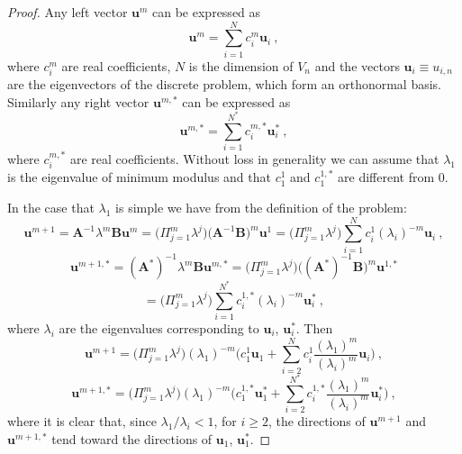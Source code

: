 \documentclass[smallextended]{svjour3}
\begin{document}
\begin{proof}

Any left vector $\mathbf{u}^m$ can be expressed as 
$$
\mathbf{u}^m=\sum_{i=1}^N c_i^m \mathbf{u}_i\ ,
$$
where $c_i^m$ are real coefficients, $N$ is the dimension of $V_n$ and the vectors $\mathbf{u}_i\equiv u_{i,n}$ are the eigenvectors of the discrete problem, which form an orthonormal basis.
Similarly any right vector $\mathbf{u}^{m,*}$ can be expressed as 
$$
\mathbf{u}^{m,*}=\sum_{i=1}^{N^*} c_i^{m,*} \mathbf{u}_i^*\ ,
$$
where $c_i^{m,*}$ are real coefficients.
Without loss in generality we can assume that $\lambda_1$ is the 
eigenvalue of minimum modulus and that $c_1^1$ and $c_1^{1,*}$ are different from 0.

In the case that $\lambda_1$ is simple we have from the definition of the problem:
$$
\mathbf{u}^{m+1}=\mathbf{A}^{-1}\lambda^m\mathbf{B}\mathbf{u}^{m}
=\Big(\Pi_{j=1}^m\lambda^{j}\Big)\Big(\mathbf{A}^{-1}\mathbf{B}\Big)^m\mathbf{u}^1
=\Big(\Pi_{j=1}^m\lambda^{j}\Big)\sum_{i=1}^N c_i^1 (\lambda_i)^{-m}\mathbf{u}_i\ ,
$$
$$
\mathbf{u}^{m+1,*}=(\mathbf{A}^*)^{-1}\lambda^m\mathbf{B}\mathbf{u}^{m,*}
=\Big(\Pi_{j=1}^m\lambda^{j}\Big)\Big((\mathbf{A}^*)^{-1}\mathbf{B}\Big)^m\mathbf{u}^{1,*}
$$
$$
=\Big(\Pi_{j=1}^m\lambda^{j}\Big)\sum_{i=1}^{N^*} c_i^{1,*} (\lambda_i)^{-m}\mathbf{u}_i^*\ ,
$$
where $\lambda_i$ are the eigenvalues corresponding to $\mathbf{u}_i$, $\mathbf{u}_i^*$.
Then
\begin{equation}\label{eq:picard_proof_1}
\mathbf{u}^{m+1}=\Big(\Pi_{j=1}^m\lambda^{j}\Big)(\lambda_1)^{-m}\Big( c_1^1 \mathbf{u}_1 +
\sum_{i=2}^N c_i^1\frac{(\lambda_1)^m}{(\lambda_i)^{m}}\mathbf{u}_i\Big) \ ,
\end{equation}
\begin{equation}\label{eq:picard_proof_2}
\mathbf{u}^{m+1,*}=\Big(\Pi_{j=1}^m\lambda^{j}\Big)(\lambda_1)^{-m}\Big( c_1^{1,*} \mathbf{u}_1^* +
\sum_{i=2}^{N^*} c_i^{1,*}\frac{(\lambda_1)^m}{(\lambda_i)^{m}}\mathbf{u}_i^*\Big) \ ,
\end{equation}
where it is clear that, since $\lambda_1/\lambda_i<1$, for $i\ge 2$, the directions of $\mathbf{u}^{m+1}$ and $\mathbf{u}^{m+1,*}$ tend toward the directions of $\mathbf{u}_1$, $\mathbf{u}_1^*$.


\end{proof}
\end{document}

